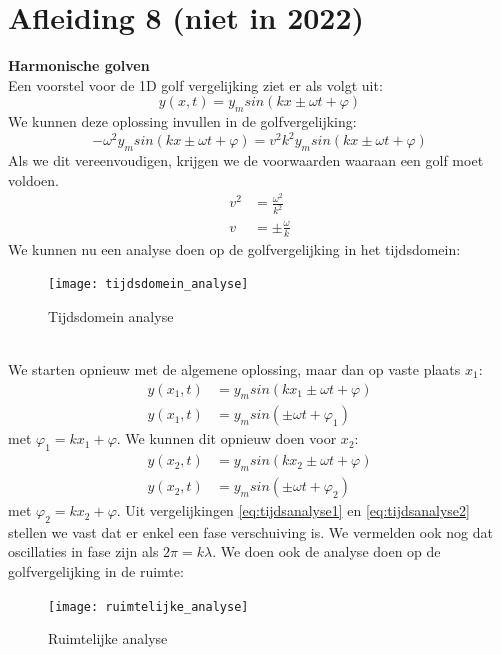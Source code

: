 \documentclass[a4paper,kul]{kulakarticle} %
\begin{document}
\section{Afleiding 8 (niet in 2022)}
\textbf{Harmonische golven}\\
Een voorstel voor de 1D golf vergelijking ziet er als volgt uit:
\begin{equation*}
	y(x,t) = y_msin(kx \pm \omega t +\varphi)
\end{equation*}
We kunnen deze oplossing invullen in de golfvergelijking:
\begin{equation*}
	-\omega^2y_msin(kx \pm \omega t +\varphi)=v^2k^2y_msin(kx \pm \omega t +\varphi)
\end{equation*}
Als we dit vereenvoudigen, krijgen we de voorwaarden waaraan een golf moet voldoen.
\begin{align*}
	v^2 & = \frac{\omega^2}{k^2}\\
	v & = \pm\frac{\omega}{k}
\end{align*}
We kunnen nu een analyse doen op de golfvergelijking in het tijdsdomein:\\
\begin{figure}[h]
	\centering
	\texttt{[image: tijdsdomein\_analyse]}
	\caption[Tijdsdomein analyse]{Tijdsdomein analyse}
	\label{fig:tijdsdomein}
\end{figure}\\
We starten opnieuw met de algemene oplossing, maar dan op vaste plaats $x_1$:
\begin{align}
	y(x_1,t) &= y_msin(kx_1 \pm \omega t +\varphi)\\
	\label{eq:tijdsanalyse1}
	y(x_1,t) &= y_msin(\pm \omega t +\varphi_1)
\end{align}
met $\varphi_1 = kx_1 +\varphi$. We kunnen dit opnieuw doen voor $x_2$:
\begin{align}
	y(x_2,t) &= y_msin(kx_2 \pm \omega t +\varphi)\\
	\label{eq:tijdsanalyse2}
	y(x_2,t) &= y_msin(\pm \omega t +\varphi_2)
\end{align}
met $\varphi_2 = kx_2 +\varphi$. Uit vergelijkingen \ref{eq:tijdsanalyse1} en \ref{eq:tijdsanalyse2} stellen we vast dat er enkel een fase verschuiving is. We vermelden ook nog dat oscillaties in fase zijn als $2\pi = k\lambda$.
\newpage
We doen ook de analyse doen op de golfvergelijking in de ruimte:\\
\begin{figure}[h]
	\centering
	\texttt{[image: ruimtelijke\_analyse]}
	\caption[Ruimtelijke analyse]{Ruimtelijke analyse}
	\label{fig:ruimtelijkeanalyse}
\end{figure}\\
\end{document}
